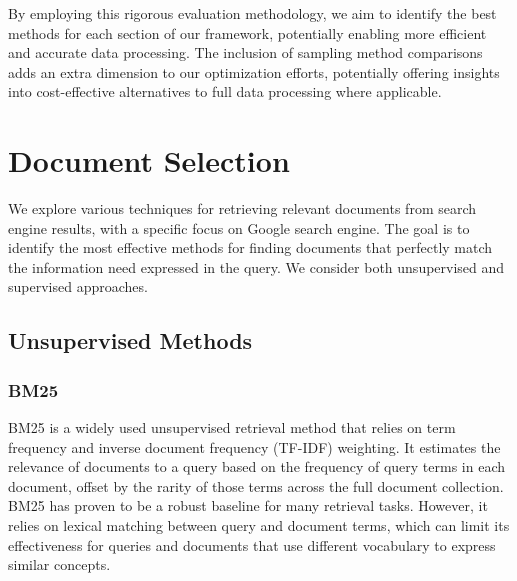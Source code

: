 By employing this rigorous evaluation methodology, we aim to identify the best methods for each section of our framework, potentially enabling more efficient and accurate data processing.
The inclusion of sampling method comparisons adds an extra dimension to our optimization efforts, potentially offering insights into cost-effective alternatives to full data processing where applicable.



\section{Document Selection}\label{sec:document-selection}
We explore various techniques for retrieving relevant documents from search engine results, with a specific focus on Google search engine.
The goal is to identify the most effective methods for finding documents that perfectly match the information need expressed in the query.
We consider both unsupervised and supervised approaches.

\subsection{Unsupervised Methods}\label{subsec:unsupervised-methods}

\subsubsection{BM25}
BM25 is a widely used unsupervised retrieval method that relies on term frequency and inverse document frequency (TF-IDF) weighting.
It estimates the relevance of documents to a query based on the frequency of query terms in each document, offset by the rarity of those terms across the full document collection.
BM25 has proven to be a robust baseline for many retrieval tasks.
However, it relies on lexical matching between query and document terms, which can limit its effectiveness for queries and documents that use different vocabulary to express similar concepts.

